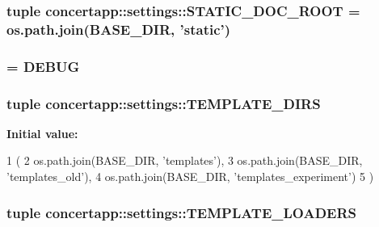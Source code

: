 \label{namespaceconcertapp_1_1settings_a257dac3a040b91223f0947be327d8872}
\hypertarget{namespaceconcertapp_1_1settings_aff4e4ddff9aa3f3ca27c553cf9d5d912}{
\subsubsection[{STATIC\_\-DOC\_\-ROOT}]{\setlength{\rightskip}{0pt plus 5cm}tuple {\bf concertapp::settings::STATIC\_\-DOC\_\-ROOT} = os.path.join({\bf BASE\_\-DIR}, 'static')}}
\label{namespaceconcertapp_1_1settings_aff4e4ddff9aa3f3ca27c553cf9d5d912}
\hypertarget{namespaceconcertapp_1_1settings_aec129365a35dbd3f95c063e3eabc25d9}{
\subsubsection[{TEMPLATE\_\-DEBUG}]{ = {\bf DEBUG}}}
\label{namespaceconcertapp_1_1settings_aec129365a35dbd3f95c063e3eabc25d9}
\hypertarget{namespaceconcertapp_1_1settings_a4311c14ccea72ad83d38292bbe2438bd}{
\subsubsection[{TEMPLATE\_\-DIRS}]{\setlength{\rightskip}{0pt plus 5cm}tuple {\bf concertapp::settings::TEMPLATE\_\-DIRS}}}
\label{namespaceconcertapp_1_1settings_a4311c14ccea72ad83d38292bbe2438bd}
{\bfseries Initial value:}
\begin{DoxyCode}
1 (
2     os.path.join(BASE_DIR, 'templates'),
3     os.path.join(BASE_DIR, 'templates_old'),
4     os.path.join(BASE_DIR, 'templates_experiment')
5     )
\end{DoxyCode}
\hypertarget{namespaceconcertapp_1_1settings_aa9c92e85f76082a6f35d9634e5a0ed1d}{
\subsubsection[{TEMPLATE\_\-LOADERS}]{\setlength{\rightskip}{0pt plus 5cm}tuple {\bf concertapp::settings::TEMPLATE\_\-LOADERS}}}
